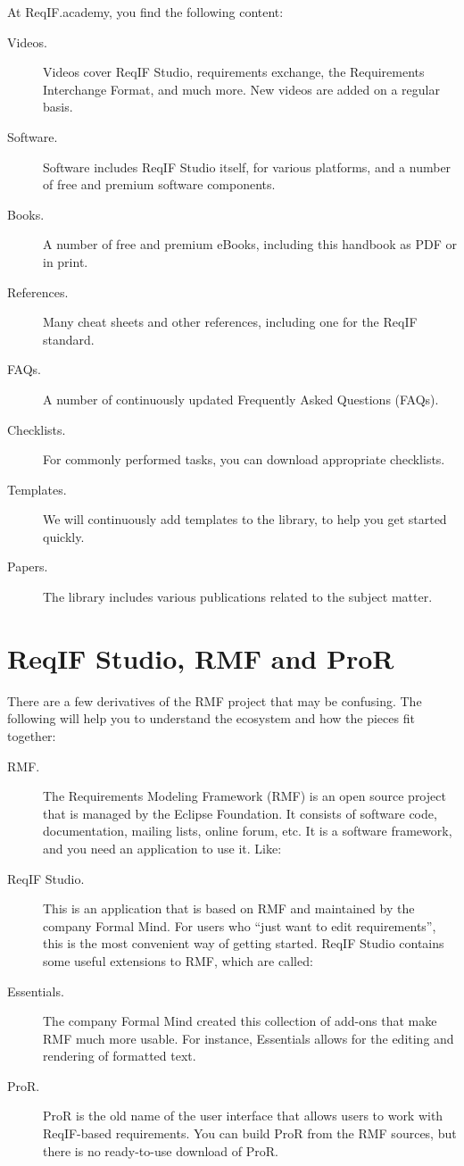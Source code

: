 At ReqIF.academy, you find the following content:

\begin{description}
\item[Videos.] Videos cover ReqIF Studio, requirements exchange, the Requirements Interchange Format, and much more. New videos are added on a regular basis.
\item[Software.] Software includes ReqIF Studio itself, for various platforms, and a number of free and premium software components.
\item[Books.] A number of free and premium eBooks, including this handbook as PDF or in print.
\item[References.] Many cheat sheets and other references, including one for the ReqIF standard.
\item[FAQs.] A number of continuously updated Frequently Asked Questions (FAQs).
\item[Checklists.] For commonly performed tasks, you can download appropriate checklists.
\item[Templates.] We will continuously add templates to the library, to help you get started quickly.
\item[Papers.] The library includes various publications related to the subject matter.
\end{description}  

\section{ReqIF Studio, RMF and ProR}
\label{sec:rmf_derivatives}

There are a few derivatives of the RMF project that may be confusing.  The following will
help you to understand the ecosystem and how the pieces fit together:

\begin{description}
\item[RMF.] The Requirements Modeling Framework (RMF) is an open source project that is managed by the Eclipse Foundation.  It consists of software code, documentation, mailing lists, online forum, etc. It is a software framework, and you need an application to use it. Like:
\item[ReqIF Studio.] This is an application that is based on RMF and maintained by the company Formal Mind.  For users who ``just want to edit requirements'', this is the most convenient way of getting started. ReqIF Studio contains some useful extensions to RMF, which are called:
\item[Essentials.] The company Formal Mind created this collection of add-ons that make RMF much more usable.  For instance, Essentials allows for the editing and rendering of formatted text.
\item[ProR.] ProR is the old name of the user interface that allows users to work with ReqIF-based requirements.  You can build ProR from the RMF sources, but there is no ready-to-use download of ProR.
\end{description}

